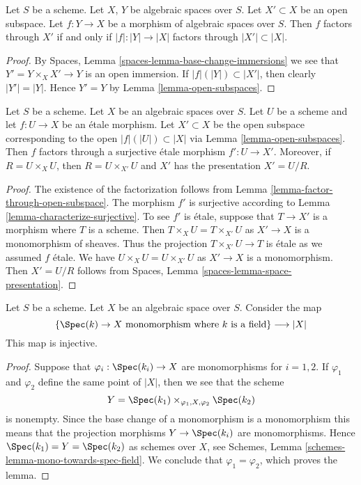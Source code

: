 \begin{lemma}
\label{lemma-factor-through-open-subspace}
Let $S$ be a scheme.
Let $X$, $Y$ be algebraic spaces over $S$.
Let $X' \subset X$ be an open subspace.
Let $f : Y \to X$ be a morphism of algebraic spaces over $S$.
Then $f$ factors through $X'$ if and only if $|f| : |Y| \to |X|$
factors through $|X'| \subset |X|$.
\end{lemma}

\begin{proof}
By Spaces, Lemma \ref{spaces-lemma-base-change-immersions}
we see that $Y' = Y \times_X X' \to Y$ is an open immersion.
If $|f|(|Y|) \subset |X'|$, then clearly $|Y'| = |Y|$. Hence $Y' = Y$ by
Lemma \ref{lemma-open-subspaces}.
\end{proof}

\begin{lemma}
\label{lemma-etale-image-open}
Let $S$ be a scheme. Let $X$ be an algebraic spaces over $S$.
Let $U$ be a scheme and let $f : U \to X$ be an \'etale morphism.
Let $X' \subset X$ be the open subspace corresponding to
the open $|f|(|U|) \subset |X|$ via
Lemma \ref{lemma-open-subspaces}.
Then $f$ factors through a surjective \'etale morphism $f' : U \to X'$.
Moreover, if $R = U \times_X U$, then $R = U \times_{X'} U$ and $X'$ has
the presentation $X' = U/R$.
\end{lemma}

\begin{proof}
The existence of the factorization follows from
Lemma \ref{lemma-factor-through-open-subspace}.
The morphism $f'$ is surjective according to
Lemma \ref{lemma-characterize-surjective}.
To see $f'$ is \'etale, suppose that $T \to X'$ is a morphism
where $T$ is a scheme. Then $T \times_X U = T \times_{X'} U$
as $X' \to X$ is a monomorphism of sheaves. Thus the projection
$T \times_{X'} U \to T$ is \'etale as we assumed $f$ \'etale.
We have $U \times_X U = U \times_{X'} U$ as $X' \to X$ is a monomorphism.
Then $X' = U/R$ follows from
Spaces, Lemma \ref{spaces-lemma-space-presentation}.
\end{proof}

\begin{lemma}
\label{lemma-points-monomorphism}
Let $S$ be a scheme. Let $X$ be an algebraic space over $S$.
Consider the map
$$
\{\Spec(k) \to X \text{ monomorphism where }k\text{ is a field}\}
\longrightarrow
|X|
$$
This map is injective.
\end{lemma}

\begin{proof}
Suppose that $\varphi_i : \Spec(k_i) \to X$ are monomorphisms
for $i = 1, 2$. If $\varphi_1$ and $\varphi_2$ define the same point
of $|X|$, then we see that the scheme
$$
Y = \Spec(k_1) \times_{\varphi_1, X, \varphi_2} \Spec(k_2)
$$
is nonempty. Since the base change of a monomorphism is a monomorphism
this means that the projection morphisms $Y \to \Spec(k_i)$
are monomorphisms. Hence $\Spec(k_1) = Y = \Spec(k_2)$
as schemes over $X$, see
Schemes, Lemma \ref{schemes-lemma-mono-towards-spec-field}.
We conclude that $\varphi_1 = \varphi_2$, which proves the lemma.
\end{proof}

